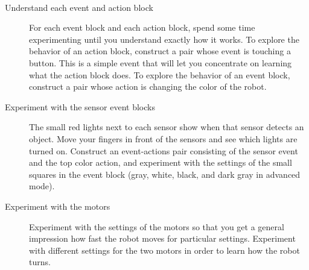 \label{a.tips}

\
\begin{description}

\item[Understand each event and action block] For each event block and
each action block, spend some time experimenting until you understand
exactly how it works. To explore the behavior of an action block,
construct a pair whose event is touching a button. This is a simple
event that will let you concentrate on learning what the action block
does. To explore the behavior of an event block, construct a pair whose
action is changing the color of the robot.

\item[Experiment with the sensor event blocks] The small red lights next
to each sensor show when that sensor detects an object. Move your
fingers in front of the sensors and see which lights are turned on.
Construct an event-actions pair consisting of the sensor event and the
top color action, and experiment with the settings of the small squares
in the event block (gray, white, black, and dark gray in advanced mode).

\item[Experiment with the motors] Experiment with the settings of the
motors so that you get a general impression how fast the robot moves for
particular settings. Experiment with different settings for the two
motors in order to learn how the robot turns.

\end{description}



